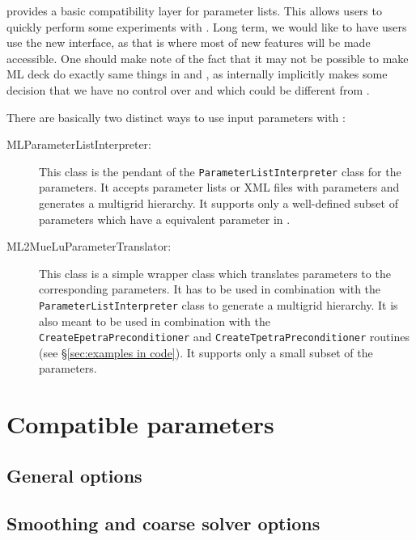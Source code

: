  
\label{sec:ml_options}
\muelu provides a basic compatibility layer for \ml parameter lists. This allows \ml users to quickly perform some experiments with \muelu. Long term, we would like to have users use the new \muelu interface, as that is where most of new features will be made accessible. One should make note of the fact that it may not be possible to make ML deck do exactly same things in \ml and \muelu, as internally \ml implicitly makes some decision that we have no control over and which could be different from \muelu.

\noindent There are basically two distinct ways to use \ml input parameters with \muelu:
\begin{description}
\item[MLParameterListInterpreter:] This class is the pendant of the \texttt{ParameterListInterpreter} class for the \muelu parameters. It accepts parameter lists or XML files with \ml parameters and generates a \muelu multigrid hierarchy. It supports only a well-defined subset of \ml parameters which have a equivalent parameter in \muelu.
\item[ML2MueLuParameterTranslator:] This class is a simple wrapper class which translates \ml parameters to the corresponding \muelu parameters. It has to be used in combination with the \muelu \texttt{ParameterListInterpreter} class to generate a \muelu multigrid hierarchy. It is also meant to be used in combination with the \texttt{CreateEpetraPreconditioner} and \texttt{CreateTpetraPreconditioner} routines (see \S\ref{sec:examples in code}). It supports only a small subset of the \ml parameters.
\end{description}

\section{Compatible \ml parameters}

\subsection{General \ml options}


\subsection{Smoothing and coarse solver options}


